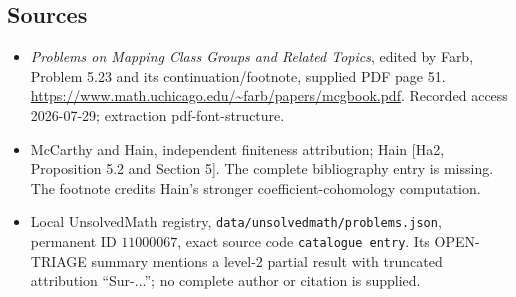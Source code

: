 \documentclass[11pt]{article}
\begin{document}
\subsection{Sources}
\begin{itemize}
\item \emph{Problems on Mapping Class Groups and Related Topics}, edited by Farb, Problem 5.23 and its continuation/footnote, supplied PDF page 51. \url{https://www.math.uchicago.edu/~farb/papers/mcgbook.pdf}. Recorded access 2026-07-29; extraction pdf-font-structure.
\item McCarthy and Hain, independent finiteness attribution; Hain [Ha2, Proposition 5.2 and Section 5]. The complete bibliography entry is missing. The footnote credits Hain's stronger coefficient-cohomology computation.
\item Local UnsolvedMath registry, \texttt{data/unsolvedmath/problems.json}, permanent ID \(11000067\), exact source code \texttt{catalogue entry}. Its OPEN-TRIAGE summary mentions a level-\(2\) partial result with truncated attribution ``Sur-...''; no complete author or citation is supplied.
\end{itemize}
\end{document}
